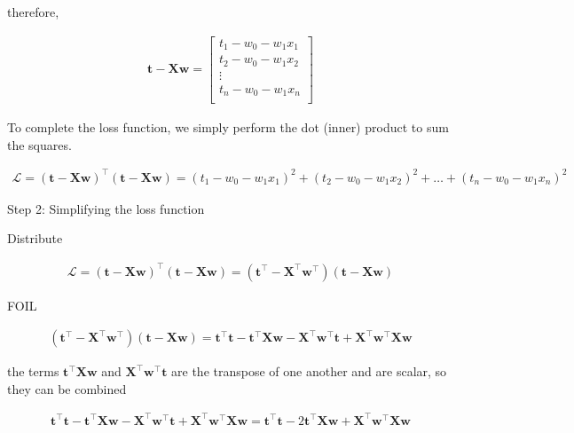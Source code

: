 \documentclass[10pt]{article}
\begin{document}
\begin{itemize}
therefore,

\begin{eqnarray*}
\mathbf{t} - \mathbf{X} \mathbf{w} =
\begin{bmatrix}
    t_1 - w_0 - w_1x_1\\[0.3em]
    t_2 - w_0 - w_1x_2\\[0.3em]
    \vdots\\[0.3em]
    t_n - w_0 - w_1x_n\\[0.3em]
\end{bmatrix}
\end{eqnarray*}

To complete the loss function, we simply perform the dot (inner) product to sum the squares.

\begin{eqnarray*}
\mathcal{L} = (\mathbf{t} - \mathbf{X} \mathbf{w})^\top(\mathbf{t} - \mathbf{X} \mathbf{w}) =
(t_1 - w_0 - w_1x_1)^2 + (t_2 - w_0 - w_1x_2)^2 + \dots + (t_n - w_0 - w_1x_n)^2
\end{eqnarray*}

Step 2: Simplifying the loss function

Distribute

\begin{eqnarray*}
\mathcal{L} = (\mathbf{t} - \mathbf{X} \mathbf{w})^\top(\mathbf{t} - \mathbf{X} \mathbf{w}) =
(\mathbf{t}^\top - \mathbf{X}^\top \mathbf{w}^\top)(\mathbf{t} - \mathbf{X} \mathbf{w}) 
\end{eqnarray*}

FOIL

\begin{eqnarray*}
(\mathbf{t}^\top - \mathbf{X}^\top \mathbf{w}^\top)(\mathbf{t} - \mathbf{X} \mathbf{w}) =
\mathbf{t}^\top \mathbf{t} - \mathbf{t}^\top \mathbf{X} \mathbf{w} - \mathbf{X}^\top \mathbf{w}^\top \mathbf{t} + \mathbf{X}^\top \mathbf{w}^\top \mathbf{X} \mathbf{w}
\end{eqnarray*}

the terms $\mathbf{t}^\top \mathbf{X} \mathbf{w}$ and $\mathbf{X}^\top \mathbf{w}^\top \mathbf{t}$ are the transpose of one another and are scalar, so they can be combined

\begin{eqnarray*}
\mathbf{t}^\top \mathbf{t} - \mathbf{t}^\top \mathbf{X} \mathbf{w} - \mathbf{X}^\top \mathbf{w}^\top \mathbf{t} + \mathbf{X}^\top \mathbf{w}^\top \mathbf{X} \mathbf{w} =
\mathbf{t}^\top \mathbf{t} - 2\mathbf{t}^\top \mathbf{X} \mathbf{w} + \mathbf{X}^\top \mathbf{w}^\top \mathbf{X} \mathbf{w}
\end{eqnarray*}


\end{itemize}
\end{document}
